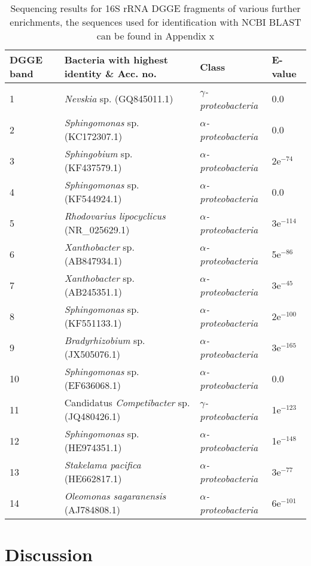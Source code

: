 \documentclass{article}
\begin{document}
\begin{table}
\begin{tabular}{ | l | p{7.8cm} | p{3cm} | l | }
\hline
DGGE band & Bacteria with highest identity \& Acc. no. & Class & E-value \\
\hline
1 & \emph{Nevskia} sp. (GQ845011.1) & \emph{$\gamma$-proteobacteria} & 0.0  \\
\hline
2 & \emph{Sphingomonas} sp. (KC172307.1) & \emph{$\alpha$-proteobacteria} & 0.0 \\
\hline
3 & \emph{Sphingobium} sp. (KF437579.1) & \emph{$\alpha$-proteobacteria} & 2e$^{-74}$ \\
\hline
4 & \emph{Sphingomonas} sp. (KF544924.1) & \emph{$\alpha$-proteobacteria} & 0.0  \\
\hline
5 & \emph{Rhodovarius lipocyclicus} (NR\_025629.1) & \emph{$\alpha$-proteobacteria} & 3e$^{-114}$ \\
\hline
6 & \emph{Xanthobacter} sp. (AB847934.1) & \emph{$\alpha$-proteobacteria} & 5e$^{-86}$  \\
\hline
7 & \emph{Xanthobacter} sp. (AB245351.1) & \emph{$\alpha$-proteobacteria} & 3e$^{-45}$  \\
\hline
8 & \emph{Sphingomonas} sp.(KF551133.1) & \emph{$\alpha$-proteobacteria} & 2e$^{-100}$  \\
\hline
9 & \emph{Bradyrhizobium} sp. (JX505076.1) & \emph{$\alpha$-proteobacteria} & 3e$^{-165}$  \\
\hline
10 & \emph{Sphingomonas} sp. (EF636068.1) & \emph{$\alpha$-proteobacteria} & 0.0  \\
\hline
11 & Candidatus \emph{Competibacter} sp. (JQ480426.1) & \emph{$\gamma$-proteobacteria} & 1e$^{-123}$  \\
\hline
12 & \emph{Sphingomonas} sp. (HE974351.1) & \emph{$\alpha$-proteobacteria} &  1e$^{-148}$ \\
\hline
13 & \emph{Stakelama pacifica} (HE662817.1) & \emph{$\alpha$-proteobacteria} & 3e$^{-77}$  \\
\hline
14 & \emph{Oleomonas sagaranensis} (AJ784808.1) & \emph{$\alpha$-proteobacteria} & 6e$^{-101}$  \\
\hline
\end{tabular}
\caption{Sequencing results for 16S rRNA DGGE fragments of various further enrichments, the sequences used for identification with NCBI BLAST can be found in Appendix x}
\end{table}

\newpage
\section{Discussion}
\end{document}
